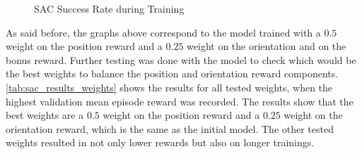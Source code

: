 \begin{figure}[H]%
    \centering
    {\fontsize{8}{11}\selectfont}
    \caption{SAC Success Rate during Training}
    \label{fig:success_rate}
\end{figure}

As said before, the graphs above correspond to the model trained with a $0.5$ weight on the position reward and a $0.25$ weight on the orientation and on the bonus reward. Further testing was done with the model to check which would be the best weights to balance the position and orientation reward components. \autoref{tab:sac_results_weights} shows the results for all tested weights, when the highest validation mean episode reward was recorded. The results show that the best weights are a $0.5$ weight on the position reward and a $0.25$ weight on the orientation reward, which is the same as the initial model. The other tested weights resulted in not only lower rewards but also on longer trainings.

